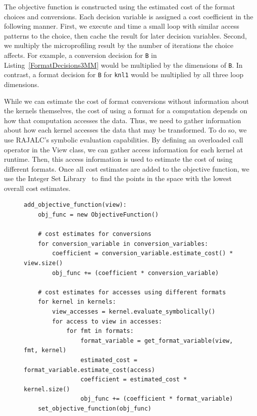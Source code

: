 \documentclass[sigconf]{acmart}
\begin{document}
The objective function is constructed using the estimated cost of the format choices and conversions. 
Each decision variable is assigned a cost coefficient in the following manner.
First, we execute and time a small loop with similar access patterns to the choice, then cache the result for later decision variables.
Second, we multiply the microprofiling result by the number of iterations the choice affects.
For example, a conversion decision for \verb.B. in Listing~\ref{FormatDecisions3MM} would be multiplied by the dimensions of \verb.B..
In contrast, a format decision for \verb.B. for \verb.knl1. would be multiplied by all three loop dimensions. 

While we can estimate the cost of format conversions without information about the kernels themselves, the cost of using a format for a computation depends on how that computation accesses the data.
Thus, we need to gather information about how each kernel accesses the data that may be transformed. 
To do so, we use RAJALC's symbolic evaluation capabilities. 
By defining an overloaded call operator in the View class, we can gather access information for each kernel at runtime. 
Then, this access information is used to estimate the cost of using different formats. 
Once all cost estimates are added to the objective function, we use the Integer Set Library~\cite{verdoolaege2010isl} to find the points in the space with the lowest overall cost estimates. 



\begin{figure}
\begin{lstlisting}[caption={Algorithm for constructing objective function.}, label={AlgObjFunc}]
add_objective_function(view):
	obj_func = new ObjectiveFunction()
	
	# cost estimates for conversions
	for conversion_variable in conversion_variables:
		coefficient = conversion_variable.estimate_cost() * view.size()
		obj_func += (coefficient * conversion_variable)
	
	# cost estimates for accesses using different formats
	for kernel in kernels:
		view_accesses = kernel.evaluate_symbolically()
		for access to view in accesses:
			for fmt in formats:
				format_variable = get_format_variable(view, fmt, kernel)
				estimated_cost = format_variable.estimate_cost(access)
				coefficient = estimated_cost * kernel.size()
				obj_func += (coefficient * format_variable)
	set_objective_function(obj_func)
\end{lstlisting}
\end{figure}
\end{document}
